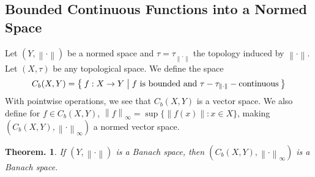 \documentclass[11pt, a4paper]{memoir}
\newcommand{\norm}[1]{\ensuremath{\left\lVert#1\right\rVert}}
\theoremstyle{change}
\newtheorem{theorem}{Theorem.}[section]
\theoremstyle{plain}
\theoremstyle{nonumberplain}
\numberwithin{equation}{section}
\begin{document}
\subsection{Bounded Continuous Functions into a Normed Space}
Let $(Y,\norm{\cdot})$ be a normed space and $\tau=\tau_{\norm{\cdot}}$ the topology induced by $\norm{\cdot}$.
Let $(X,\tau)$ be any topological space.
We define the space
\begin{equation*}
    C_b(X,Y) = \Set{f:X\to Y | f\text{ is bounded  and }\tau-\tau_{\norm{\cdot}}-\text{continuous}}
\end{equation*}
With pointwise operations, we see that $C_b(X,Y)$ is a vector space.
We also define for $f\in C_b(X,Y)$, $\norm{f}_\infty=\sup\{\norm{f(x)}:x\in X\}$, making $(C_b(X,Y),\norm{\cdot}_\infty)$ a normed vector space.
\begin{theorem}
    If $(Y,\norm{\cdot})$ is a Banach space, then $(C_b(X,Y),\norm{\cdot}_\infty)$ is a Banach space.
\end{theorem}
\end{document}
